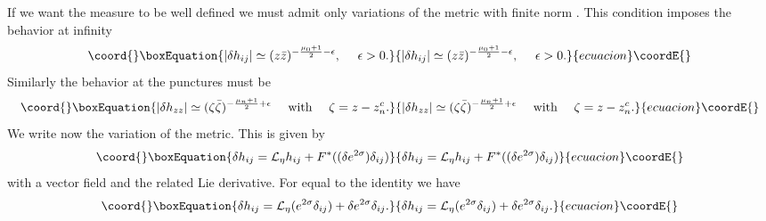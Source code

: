 \documentclass[a4paper,12pt]{article}
\begin{document}
If we want the measure \coordHE{} to be well defined we must admit
only variations of the metric with finite norm
\coordHE{}.
This condition imposes the behavior at infinity
\begin{equation}\coord{}\boxEquation{\label{condinfty}
|\delta h_{ij}| \simeq (z\bar z)^{-\frac{\mu_0+1}{2}-\epsilon},~~~~
\epsilon >0.
}{|\delta h_{ij}| \simeq (z\bar z)^{-\frac{\mu_0+1}{2}-\epsilon},~~~~
\epsilon >0.
}{ecuacion}\coordE{}\end{equation}
Similarly the behavior at the punctures \coordHE{} must be
\begin{equation}\coord{}\boxEquation{\label{condpunct}
|\delta h_{zz}| \simeq (\zeta
 \bar\zeta)^{-\frac{\mu_n+1}{2}+\epsilon}~~~~{\rm with}~~~~\zeta=
 z-z^c_n. 
}{|\delta h_{zz}| \simeq (\zeta
 \bar\zeta)^{-\frac{\mu_n+1}{2}+\epsilon}~~~~{\rm with}~~~~\zeta=
 z-z^c_n. 
}{ecuacion}\coordE{}\end{equation}
We write now the variation of the metric. This is given by
\begin{equation}\coord{}\boxEquation{\label{decompdeltah}
\delta h_{ij} = \mathcal{L}_{\eta} h_{ij} + F^*((\delta
e^{2\sigma})\delta_{ij})
}{\delta h_{ij} = \mathcal{L}_{\eta} h_{ij} + F^*((\delta
e^{2\sigma})\delta_{ij})
}{ecuacion}\coordE{}\end{equation}
with \myHighlight{$\eta$}\coordHE{} a vector field and \coordHE{} the related Lie
derivative. For \coordHE{} equal to the identity we have
\begin{equation}\coord{}\boxEquation{
\delta h_{ij} = \mathcal{L}_{\eta} (e^{2\sigma}\delta_{ij}) + \delta 
e^{2\sigma}\delta_{ij}.
}{
\delta h_{ij} = \mathcal{L}_{\eta} (e^{2\sigma}\delta_{ij}) + \delta 
e^{2\sigma}\delta_{ij}.
}{ecuacion}\coordE{}\end{equation}
\end{document}
